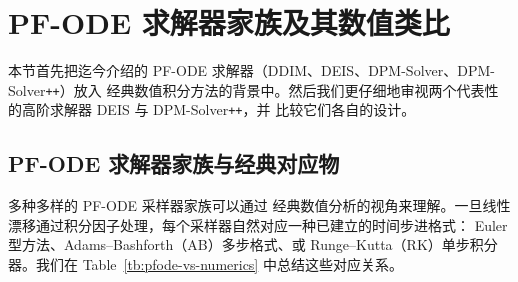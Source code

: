 \newpage


\section{PF-ODE 求解器家族及其数值类比}\label{sec:summary-solver}

本节首先把迄今介绍的 PF-ODE 求解器（DDIM、DEIS、DPM-Solver、DPM-Solver\texttt{++}）放入
经典数值积分方法的背景中。然后我们更仔细地审视两个代表性的高阶求解器 DEIS 与 DPM-Solver\texttt{++}，并
比较它们各自的设计。

\subsection{PF-ODE 求解器家族与经典对应物}

多种多样的 PF-ODE 采样器家族可以通过
经典数值分析的视角来理解。一旦线性漂移通过积分因子处理，每个采样器自然对应一种已建立的时间步进格式：
Euler 型方法、Adams--Bashforth（AB）多步格式、或 Runge--Kutta（RK）单步积分器。我们在
Table~\ref{tb:pfode-vs-numerics} 中总结这些对应关系。


\begin{table}[th]
  \caption{PF-ODE 采样器及其数值分析类比。
“exp.”表示对线性项采用积分因子（半线性）处理（见 ）。
AB = Adams-Bashforth，RK = Runge-Kutta。\emph{DPM-Solver-2} 见 。}
  \small
  \centering
  \label{tb:pfode-vs-numerics}
\end{table}

